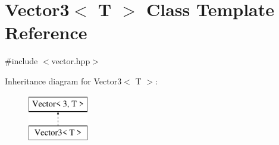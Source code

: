 \hypertarget{class_vector3}{}\section{Vector3$<$ T $>$ Class Template Reference}
\label{class_vector3}


{\ttfamily \#include $<$vector.\+hpp$>$}

Inheritance diagram for Vector3$<$ T $>$\+:\begin{figure}[H]
\begin{center}
\leavevmode
\includegraphics[height=2.000000cm]{class_vector3}
\end{center}
\end{figure}
